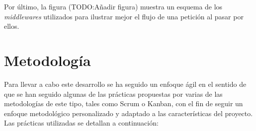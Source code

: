 \documentclass[11pt,spanish,listoffigures]{tfgetsinf}
\begin{document}
Por último, la figura (TODO:Añadir figura) muestra un esquema de los \emph{middlewares} utilizados para ilustrar mejor el flujo de una petición al pasar por ellos.



	\section{Metodología} \label{metodologia}

Para llevar a cabo este desarrollo se ha seguido un enfoque ágil en el sentido de que se han seguido algunas de las prácticas propuestas por varias de las metodologías de este tipo, tales como Scrum o Kanban, con el fin de seguir un enfoque metodológico personalizado y adaptado a las características del proyecto. Las prácticas utilizadas se detallan a continuación:
\end{document}
